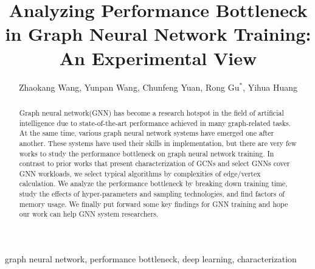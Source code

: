 \documentclass{elsarticle}
\begin{document}
\begin{frontmatter}

	\title{Analyzing Performance Bottleneck in Graph Neural Network Training: An Experimental View}
    \author{Zhaokang Wang, Yunpan Wang, Chunfeng Yuan, Rong Gu$^*$, Yihua Huang }
	\address{State Key Laboratory for Novel Software Technology, \\Department of Computer Science and Technology, Nanjing University, \\Nanjing 210023, China}

	\begin{abstract}
        Graph neural network(GNN) has become a research hotspot in the field of artificial intelligence due to state-of-the-art performance achieved in many graph-related tasks. At the same time, various graph neural network systems have emerged one after another.
        These systems have used their skills in implementation, but there are very few works to study the performance bottleneck on graph neural network training. In contrast to prior works that present characterization of GCNs and select GNNs cover GNN workloads,
		we select typical algorithms by complexities of edge/vertex calculation. We analyze the performance bottleneck by breaking down training time, study the effects of hyper-parameters and sampling technologies, and find factors of memory usage. 
		We finally put forward some key findings for GNN training and hope our work can help GNN system researchers.
	\end{abstract}

	\begin{keyword}
		graph neural network, performance bottleneck, deep learning, characterization
	\end{keyword}

\end{frontmatter}

\linenumbers











\end{document}
